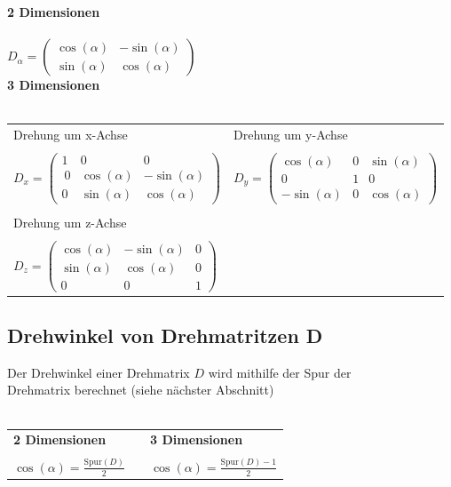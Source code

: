 			\columnbreak
					  	
		  	\textbf{2 Dimensionen} \\
		  	\\
		  	$D_{\alpha} = \begin{pmatrix} \cos(\alpha) & -\sin(\alpha)  \\ \sin(\alpha) & \cos(\alpha)  \end{pmatrix}$ \\
		  	
			\textbf{3 Dimensionen} \\
			\\
			\begin{tabular}{ll}
			Drehung um x-Achse & Drehung um y-Achse \\
			\\
			$D_{x} = \begin{pmatrix} 1 & 0 & 0 \\\
			0 & \cos(\alpha) & -\sin(\alpha)  \\ 0 & \sin(\alpha) & \cos(\alpha)  \end{pmatrix}$ & $D_{y} = \begin{pmatrix} \cos(\alpha) & 0 & \sin(\alpha) \\
			0 & 1 & 0 \\ -\sin(\alpha) & 0 & \cos(\alpha)  \end{pmatrix}$\\
			\\
			Drehung um z-Achse & \\
			\\
			$D_{z} = \begin{pmatrix} \cos(\alpha) & -\sin(\alpha) & 0 \\ \sin(\alpha) & \cos(\alpha) & 0 \\ 0 & 0 & 1 \end{pmatrix}$
			\end{tabular}
		  	
		  	
			\subsection{Drehwinkel von Drehmatritzen D}		  	
			Der Drehwinkel einer Drehmatrix $D$ wird mithilfe der Spur der \\
			Drehmatrix berechnet (siehe nächster Abschnitt) \\ 	
			\\	  			
			\begin{tabular}{lll}
			\textbf{2 Dimensionen} & & \textbf{3 Dimensionen} \\
			\\
			$\cos(\alpha) = \frac{\mathrm{Spur}(D)}{2}$ & & $\cos(\alpha) = \frac{\mathrm{Spur}(D) -1}{2}$
			\end{tabular}		  	
		  	
